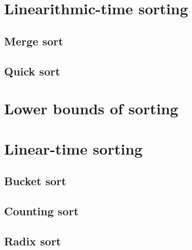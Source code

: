 \section{Linearithmic-time sorting}
\subsection{Merge sort}
\subsection{Quick sort}

\section{Lower bounds of sorting}

\section{Linear-time sorting}
\subsection{Bucket sort}
\subsection{Counting sort}
\subsection{Radix sort}

